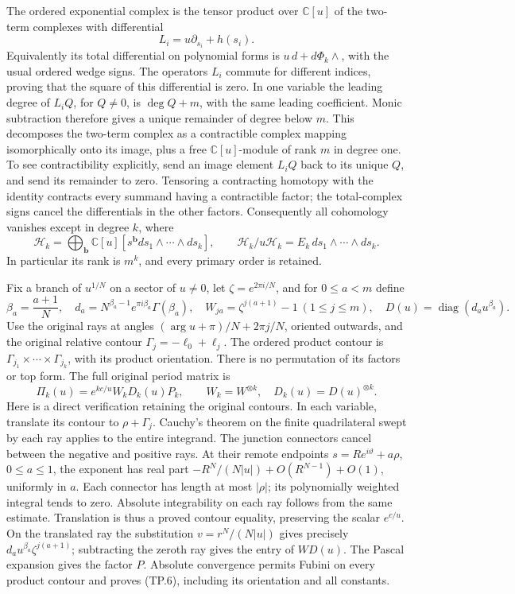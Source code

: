 The ordered exponential complex is the tensor product over
\(\mathbb C[u]\) of the two-term complexes with differential
\[
 L_i=u\partial_{s_i}+h(s_i).
 \tag{TP.3}\label{CFStage:eq:tp-differential}
\]
Equivalently its total differential on polynomial forms is
\(u\,d+d\Phi_k\wedge\), with the usual ordered wedge signs.
The operators \(L_i\) commute for different indices, proving that
the square of this differential is zero. In one variable the leading
degree of \(L_iQ\), for \(Q\ne0\), is \(\deg Q+m\), with the
same leading coefficient. Monic subtraction therefore gives a unique
remainder of degree below \(m\). This decomposes the two-term complex
as a contractible complex mapping isomorphically onto its image,
plus a free \(\mathbb C[u]\)-module of rank \(m\) in degree one.
To see contractibility explicitly, send an image element \(L_iQ\)
back to its unique \(Q\), and send its remainder to zero.
Tensoring a contracting homotopy with the identity contracts every
summand having a contractible factor; the total-complex signs cancel
the differentials in the other factors. Consequently all cohomology
vanishes except in degree \(k\), where
\[
 \mathcal H_k=\bigoplus_{\mathbf b}\mathbb C[u]
          [s^{\mathbf b}ds_1\wedge\cdots\wedge ds_k],
 \qquad \mathcal H_k/u\mathcal H_k=E_k\,ds_1\wedge\cdots\wedge ds_k.
 \tag{TP.4}\label{CFStage:eq:tp-lattice}
\]
In particular its rank is \(m^k\), and every primary order is retained.

Fix a branch of \(u^{1/N}\) on a sector of \(u\ne0\), let
\(\zeta=e^{2\pi i/N}\), and for \(0\leq a<m\) define
\[
 \beta_a=\frac{a+1}{N},\quad
 d_a=N^{\beta_a-1}e^{\pi i\beta_a}\Gamma(\beta_a),\quad
 W_{ja}=\zeta^{j(a+1)}-1\ (1\leq j\leq m),\quad
 D(u)=\operatorname{diag}(d_a u^{\beta_a}).
 \tag{TP.5}\label{CFStage:eq:tp-constants}
\]
Use the original rays at angles
\((\arg u+\pi)/N+2\pi j/N\), oriented outwards, and the original
relative contour \(\Gamma_j=-\ell_0+\ell_j\).
The ordered product contour is
\(\Gamma_{j_1}\times\cdots\times\Gamma_{j_k}\), with its product
orientation. There is no permutation of its factors or top form.
The full original period matrix is
\[
 \Pi_k(u)=e^{kc/u}W_kD_k(u)P_k,\qquad
 W_k=W^{\otimes k},\quad D_k(u)=D(u)^{\otimes k}.
 \tag{TP.6}\label{CFStage:eq:tp-period}
\]
Here is a direct verification retaining the original contours.
In each variable, translate its contour to \(\rho+\Gamma_j\).
Cauchy's theorem on the finite quadrilateral swept by each ray
applies to the entire integrand. The junction connectors cancel
between the negative and positive rays. At their remote endpoints
\(s=Re^{i\vartheta}+a\rho\), \(0\leq a\leq1\), the exponent has
real part \(-R^N/(N|u|)+O(R^{N-1})+O(1)\), uniformly in \(a\).
Each connector has length at most \(|\rho|\); its polynomially
weighted integral tends to zero. Absolute integrability on each
ray follows from the same estimate. Translation is thus a proved
contour equality, preserving the scalar \(e^{c/u}\).
On the translated ray the substitution
\(v=r^N/(N|u|)\) gives precisely
\(d_a u^{\beta_a}\zeta^{j(a+1)}\); subtracting the zeroth ray gives
the entry of \(WD(u)\). The Pascal expansion gives the factor \(P\).
Absolute convergence permits Fubini on every product contour and
proves (TP.6), including its orientation and all constants.

